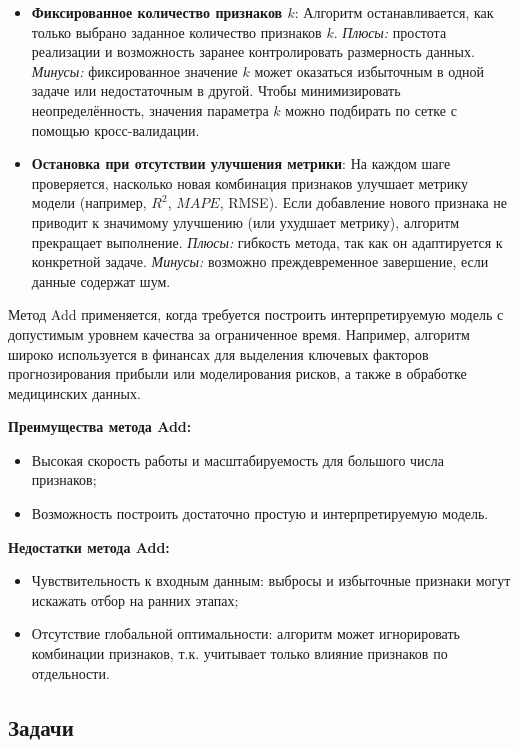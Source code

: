 \begin{itemize}
    \item \textbf{Фиксированное количество признаков $k$}:
          Алгоритм останавливается, как только выбрано заданное количество признаков $k$.
          \textit{Плюсы:} простота реализации и возможность заранее контролировать размерность данных.
          \textit{Минусы:} фиксированное значение $k$ может оказаться избыточным в одной задаче или недостаточным в другой. Чтобы минимизировать неопределённость, значения параметра $k$ можно подбирать по сетке с помощью кросс-валидации.

    \item \textbf{Остановка при отсутствии улучшения метрики}:
          На каждом шаге проверяется, насколько новая комбинация признаков улучшает метрику модели (например, \(R^2\), \(MAPE\), RMSE). Если добавление нового признака не приводит к значимому улучшению (или ухудшает метрику), алгоритм прекращает выполнение.
          \textit{Плюсы:} гибкость метода, так как он адаптируется к конкретной задаче.
          \textit{Минусы:} возможно преждевременное завершение, если данные содержат шум.
\end{itemize}

Метод Add применяется, когда требуется построить интерпретируемую модель с допустимым уровнем качества за ограниченное время. Например, алгоритм широко используется в финансах для выделения ключевых факторов прогнозирования прибыли или моделирования рисков, а также в обработке медицинских данных.

\textbf{Преимущества метода Add:}
\begin{itemize}
    \item Высокая скорость работы и масштабируемость для большого числа признаков;
    \item Возможность построить достаточно простую и интерпретируемую модель.
\end{itemize}

\textbf{Недостатки метода Add:}
\begin{itemize}
    \item Чувствительность к входным данным: выбросы и избыточные признаки могут искажать отбор на ранних этапах;
    \item Отсутствие глобальной оптимальности: алгоритм может игнорировать комбинации признаков, т.к. учитывает только влияние признаков по отдельности.
\end{itemize}

\subsection{Задачи}

